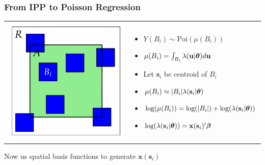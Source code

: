\documentclass[mathserif,compress]{beamer}\usepackage{graphicx, color}
\makeatletter
\def\maxwidth{ %
  \ifdim\Gin@nat@width>\linewidth
    \linewidth
  \else
    \Gin@nat@width
  \fi
}
\def\bs{\mathbf{s}}
\def\bu{\mathbf{u}}
\def\bx{\mathbf{x}}
\def\bbeta{\mbox{\boldmath $\beta$}}
\def\btheta{\mbox{\boldmath $\theta$}}
\def\log{\textrm{log}}
\def\Poi{\textrm{Poi}}
\makeatother
\begin{document}

\begin{frame}[fragile]
\frametitle{From IPP to Poisson Regression}

	\begin{tabular}{p{3.5cm} p{7.0cm}}
		\vspace{.1cm}
		\includegraphics[width = \maxwidth]{figure/irregSamples-plot} &
		\vspace{-.1cm}
		\begin{itemize}
			\item $Y(B_i) \sim \Poi(\mu(B_i))$
			\item $\mu(B_i) = \int_{B_i}\lambda(\bu|\btheta) d\bu$
			\item Let $\bs_i$ be centroid of $B_i$
			\item $\mu(B_i) \approx |{B_i}|\lambda(\bs_i|\btheta)$
			\item $\log(\mu(B_i)) = \log(|B_i|) + \log(\lambda(\bs_i|\btheta))$
			\item $\log(\lambda(\bs_i|\btheta)) = \bx(\bs_i)^\prime\bbeta$
		\end{itemize}
	\end{tabular}
Now us spatial basis functions to generate $\bx(\bs_i)$

\end{frame}
\end{document}
